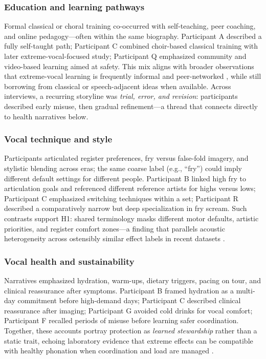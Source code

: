 \documentclass{article}
\begin{document}
\subsubsection{Education and learning pathways}
Formal classical or choral training co-occurred with self-teaching, peer coaching, and online pedagogy---often within the same biography.
Participant A described a fully self-taught path; Participant C combined choir-based classical training with later extreme-vocal-focused study; Participant Q emphasized community and video-based learning aimed at safety.
This mix aligns with broader observations that extreme-vocal learning is frequently informal and peer-networked \parencite{Ribaldini2019Terminology}, while still borrowing from classical or speech-adjacent ideas when available.
Across interviews, a recurring storyline was \emph{trial, error, and revision}: participants described early misuse, then gradual refinement---a thread that connects directly to health narratives below.

\subsubsection{Vocal technique and style}
Participants articulated register preferences, fry versus false-fold imagery, and stylistic blending across eras; the same coarse label (e.g., ``fry'') could imply different default settings for different people.
Participant B linked high fry to articulation goals and referenced different reference artists for highs versus lows; Participant C emphasized switching techniques within a set; Participant R described a comparatively narrow but deep specialization in fry scream.
Such contrasts support H1: shared terminology masks different motor defaults, artistic priorities, and register comfort zones---a finding that parallels acoustic heterogeneity across ostensibly similar effect labels in recent datasets \parencite{Tailleur2021AcousticSpace,tailleur2024emvddatasetdatasetextreme}.

\subsubsection{Vocal health and sustainability}
Narratives emphasized hydration, warm-ups, dietary triggers, pacing on tour, and clinical reassurance after symptoms.
Participant B framed hydration as a multi-day commitment before high-demand days; Participant C described clinical reassurance after imaging; Participant G avoided cold drinks for vocal comfort; Participant F recalled periods of misuse before learning safer coordination.
Together, these accounts portray protection as \emph{learned stewardship} rather than a static trait, echoing laboratory evidence that extreme effects can be compatible with healthy phonation when coordination and load are managed \parencite{Aaen2024ExtremeVocalEffects,Guzman2018MetalSinging}.
\end{document}
